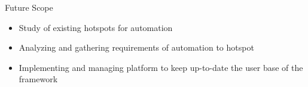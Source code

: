 \begin{frame}{Future Scope}
    \begin{itemize}
        \item Study of existing hotspots for automation
        \item Analyzing and gathering requirements of automation to hotspot
        \item Implementing and managing platform to keep up-to-date the user base of the framework
    \end{itemize}
\end{frame}